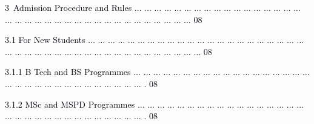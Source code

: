 \documentclass[12pt]{article}
\begin{document}
\vspace{\baselineskip}
{\fontsize{7pt}{8.4pt}\selectfont \textcolor[HTML]{00000A}{3\ Admission Procedure and Rules $ \ldots $ $ \ldots $ $ \ldots $ $ \ldots $ $ \ldots $ $ \ldots $ $ \ldots $ $ \ldots $ $ \ldots $ $ \ldots $ $ \ldots $ $ \ldots $ $ \ldots $ $ \ldots $ $ \ldots $ $ \ldots $ $ \ldots $ $ \ldots $ $ \ldots $ $ \ldots $ $ \ldots $ $ \ldots $ $ \ldots $ $ \ldots $ $ \ldots $ $ \ldots $ $ \ldots $ $ \ldots $ $ \ldots $ $ \ldots $ $ \ldots $ $ \ldots $ $ \ldots $ $ \ldots $ $ \ldots $ $ \ldots $   08}\par}\par


\vspace{\baselineskip}
\begin{adjustwidth}{0.21in}{0.0in}
{\fontsize{7pt}{8.4pt}\selectfont \textcolor[HTML]{00000A}{3.1 For New Students $ \ldots $ $ \ldots $ $ \ldots $ $ \ldots $ $ \ldots $ $ \ldots $ $ \ldots $ $ \ldots $ $ \ldots $ $ \ldots $ $ \ldots $ $ \ldots $ $ \ldots $ $ \ldots $ $ \ldots $ $ \ldots $ $ \ldots $ $ \ldots $ $ \ldots $ $ \ldots $ $ \ldots $ $ \ldots $ $ \ldots $ $ \ldots $ $ \ldots $ $ \ldots $ $ \ldots $ $ \ldots $ $ \ldots $ $ \ldots $ $ \ldots $ $ \ldots $ $ \ldots $ $ \ldots $ $ \ldots $ $ \ldots $ $ \ldots $ $ \ldots $ $ \ldots $ $ \ldots $ $ \ldots $ $ \ldots $  08}\par}\par

\end{adjustwidth}


\vspace{\baselineskip}
\begin{adjustwidth}{0.5in}{0.0in}
{\fontsize{7pt}{8.4pt}\selectfont \textcolor[HTML]{00000A}{3.1.1 B Tech and BS Programmes $ \ldots $ $ \ldots $ $ \ldots $ $ \ldots $ $ \ldots $ $ \ldots $ $ \ldots $ $ \ldots $ $ \ldots $ $ \ldots $ $ \ldots $ $ \ldots $ $ \ldots $ $ \ldots $ $ \ldots $ $ \ldots $ $ \ldots $ $ \ldots $ $ \ldots $ $ \ldots $ $ \ldots $ $ \ldots $ $ \ldots $ $ \ldots $ $ \ldots $ $ \ldots $ $ \ldots $ $ \ldots $ $ \ldots $ $ \ldots $ $ \ldots $ $ \ldots $ . 08}\par}\par

\end{adjustwidth}


\vspace{\baselineskip}
\begin{adjustwidth}{0.5in}{0.0in}
{\fontsize{7pt}{8.4pt}\selectfont \textcolor[HTML]{00000A}{3.1.2 MSc and MSPD Programmes $ \ldots $ $ \ldots $ $ \ldots $ $ \ldots $ $ \ldots $ $ \ldots $ $ \ldots $ $ \ldots $ $ \ldots $ $ \ldots $ $ \ldots $ $ \ldots $ $ \ldots $ $ \ldots $ $ \ldots $ $ \ldots $ $ \ldots $ $ \ldots $ $ \ldots $ $ \ldots $ $ \ldots $ $ \ldots $ $ \ldots $ $ \ldots $ $ \ldots $ $ \ldots $ $ \ldots $ $ \ldots $ $ \ldots $ $ \ldots $ $ \ldots $ . 08}\par}\par

\end{adjustwidth}
\end{document}
